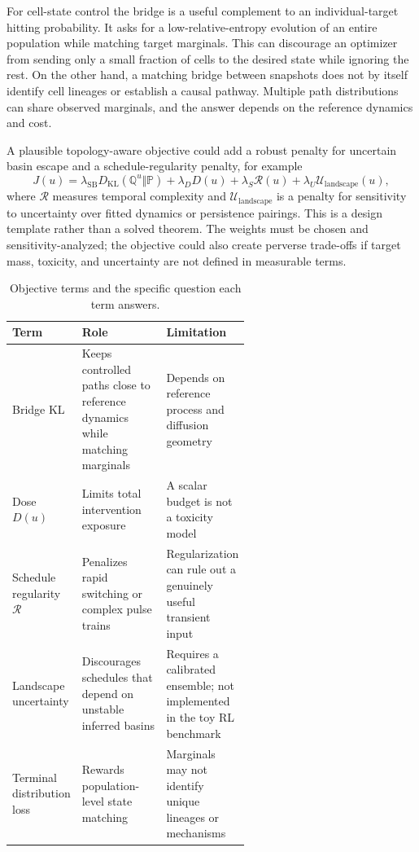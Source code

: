 \documentclass[11pt]{article}
\newcommand{\1}{\mathbf{1}}
\begin{document}
For cell-state control the bridge is a useful complement to an individual-target hitting probability. It asks for a low-relative-entropy evolution of an entire population while matching target marginals. This can discourage an optimizer from sending only a small fraction of cells to the desired state while ignoring the rest. On the other hand, a matching bridge between snapshots does not by itself identify cell lineages or establish a causal pathway. Multiple path distributions can share observed marginals, and the answer depends on the reference dynamics and cost.

A plausible topology-aware objective could add a robust penalty for uncertain basin escape and a schedule-regularity penalty, for example
\begin{equation}
J(u)=\lambda_{\mathrm{SB}}D_{\mathrm{KL}}(\mathbb{Q}^{u}\Vert\mathbb{P})+\lambda_D D(u)+\lambda_S\mathcal{R}(u)+\lambda_U\mathcal{U}_{\mathrm{landscape}}(u),
\label{eq:objective}
\end{equation}
where $\mathcal{R}$ measures temporal complexity and $\mathcal{U}_{\mathrm{landscape}}$ is a penalty for sensitivity to uncertainty over fitted dynamics or persistence pairings. This is a design template rather than a solved theorem. The weights must be chosen and sensitivity-analyzed; the objective could also create perverse trade-offs if target mass, toxicity, and uncertainty are not defined in measurable terms.

\begin{table}[tbp]\centering\small
\caption{Objective terms and the specific question each term answers.}
\label{tab:objective}
\begin{tabularx}{\linewidth}{@{}p{0.19\linewidth}p{0.39\linewidth}X@{}}\toprule
Term & Role & Limitation \\\midrule
Bridge KL & Keeps controlled paths close to reference dynamics while matching marginals & Depends on reference process and diffusion geometry \\
Dose $D(u)$ & Limits total intervention exposure & A scalar budget is not a toxicity model \\
Schedule regularity $\mathcal{R}$ & Penalizes rapid switching or complex pulse trains & Regularization can rule out a genuinely useful transient input \\
Landscape uncertainty & Discourages schedules that depend on unstable inferred basins & Requires a calibrated ensemble; not implemented in the toy RL benchmark \\
Terminal distribution loss & Rewards population-level state matching & Marginals may not identify unique lineages or mechanisms \\
\bottomrule\end{tabularx}
\end{table}
\end{document}
